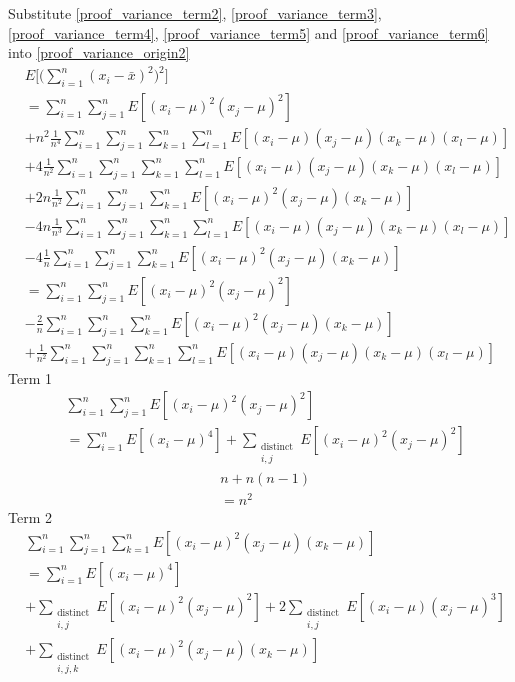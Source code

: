 \documentclass[12pt,a4paper]{report}
\begin{document}
Substitute \ref{proof_variance_term2}, \ref{proof_variance_term3}, \ref{proof_variance_term4}, \ref{proof_variance_term5} and \ref{proof_variance_term6} into \ref{proof_variance_origin2}
\begin{align}
&E \Bigg[ \Bigg( \sum_{i = 1}^{n} (x_i - \bar{x})^2 \Bigg)^2 \Bigg] \\
&= \sum_{i = 1}^{n} \sum_{j = 1}^{n} E[(x_i - \mu)^2 (x_j - \mu)^2] \\
&+ n^2 \frac{1}{n^4} \sum_{i=1}^n \sum_{j=1}^n \sum_{k=1}^n \sum_{l=1}^n E[(x_i - \mu)(x_j - \mu)(x_k - \mu)(x_l - \mu)] \\
&+4 \frac{1}{n^2} \sum_{i=1}^n \sum_{j=1}^n \sum_{k=1}^n \sum_{l=1}^n E[(x_i - \mu)(x_j - \mu)(x_k - \mu)(x_l - \mu)] \\
&+2n \frac{1}{n^2} \sum_{i = 1}^{n} \sum_{j = 1}^{n} \sum_{k = 1}^{n} E[ (x_i - \mu)^2 (x_j - \mu) (x_k - \mu) ] \\
&-4n  \frac{1}{n^3} \sum_{i=1}^n \sum_{j=1}^n \sum_{k=1}^n \sum_{l=1}^n E[(x_i - \mu)(x_j - \mu)(x_k - \mu)(x_l - \mu)] \\
&-4 \frac{1}{n} \sum_{i = 1}^{n} \sum_{j = 1}^{n} \sum_{k=1}^n E[(x_i - \mu)^2 (x_j - \mu) (x_k - \mu) ] \\
&= \sum_{i = 1}^{n} \sum_{j = 1}^{n} E[(x_i - \mu)^2 (x_j - \mu)^2] \\
&- \frac{2}{n} \sum_{i = 1}^{n} \sum_{j = 1}^{n} \sum_{k=1}^n E[(x_i - \mu)^2 (x_j - \mu) (x_k - \mu) ] \\
& + \frac{1}{n^2} \sum_{i=1}^n \sum_{j=1}^n \sum_{k=1}^n \sum_{l=1}^n E[(x_i - \mu)(x_j - \mu)(x_k - \mu)(x_l - \mu)] \label{proof_variance_origin3}
\end{align}
Term 1
\begin{align*}
& \sum_{i = 1}^{n} \sum_{j = 1}^{n} E[(x_i - \mu)^2 (x_j - \mu)^2] \\
&=\sum_{i = 1}^{n} E[(x_i - \mu)^4] + \sum_{\substack{\text{distinct} \\ i,j}} E[(x_i - \mu)^2 (x_j - \mu)^2]
\end{align*}
\begin{align*}
& n + n (n-1) \\
&= n^2
\end{align*}
Term 2
\begin{align*}
& \sum_{i = 1}^{n} \sum_{j = 1}^{n} \sum_{k=1}^n E[(x_i - \mu)^2 (x_j - \mu) (x_k - \mu) ] \\
&=\sum_{i=1}^n E[(x_i - \mu)^4] \\
&+\sum_{\substack{\text{distinct} \\ i,j}} E[(x_i - \mu)^2(x_j - \mu)^2]
+2\sum_{\substack{\text{distinct} \\ i,j}} E[(x_i - \mu)(x_j - \mu)^3] \\
&+\sum_{\substack{\text{distinct} \\ i,j,k}} E[(x_i - \mu)^2 (x_j - \mu) (x_k - \mu)]
\end{align*}
\end{document}
